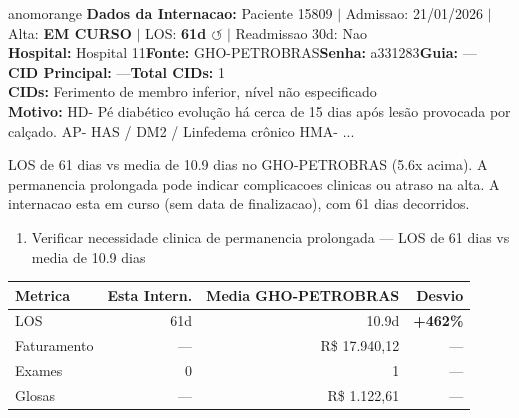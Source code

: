 \documentclass[a4paper,10pt]{article}
\begin{document}
\begin{anomalycard}[Internacao 162690 | GHO-PETROBRAS | ALTO (z=3.23)]{anomorange}
\textbf{Dados da Internacao:} Paciente 15809 $\mid$ Admissao: 21/01/2026 $\mid$ Alta: \textcolor{anomorange}{\textbf{EM CURSO}} $\mid$ LOS: \textbf{61d \textcolor{anomorange}{$\circlearrowleft$}} $\mid$ Readmissao 30d: Nao\\
\textbf{Hospital:} Hospital 11\quad\textbf{Fonte:} GHO-PETROBRAS\quad\textbf{Senha:} a331283\quad\textbf{Guia:} ---\\
\textbf{CID Principal:} {\small ---}\quad\textbf{Total CIDs:} 1\\

\textbf{CIDs:} {\scriptsize Ferimento de membro inferior, nível não especificado}\\

\textbf{Motivo:} {\scriptsize HD-  Pé diabético evolução há cerca de 15 dias após lesão provocada por calçado.   AP- HAS / DM2  / Linfedema crônico   HMA- ...}\\

\vspace{2pt}\begin{tcolorbox}[colback=severityred!20,colframe=anomorange,title={\textbf{Interpretacao de Negocio}},fonttitle=\bfseries\small,left=4pt,right=4pt,top=3pt,bottom=3pt]
{\small LOS de 61 dias vs media de 10.9 dias no GHO-PETROBRAS (5.6x acima). A permanencia prolongada pode indicar complicacoes clinicas ou atraso na alta. A internacao esta em curso (sem data de finalizacao), com 61 dias decorridos.}
\end{tcolorbox}
\begin{tcolorbox}[colback=severityyellow!30,colframe=anomorange,title={\textbf{Recomendacoes Especificas}},fonttitle=\bfseries\small,left=4pt,right=4pt,top=3pt,bottom=3pt]
\begin{enumerate}[nosep,leftmargin=16pt]
\item {\small Verificar necessidade clinica de permanencia prolongada --- LOS de 61 dias vs media de 10.9 dias}
\end{enumerate}
\end{tcolorbox}
\begin{center}\begin{tabular}{l r r r}\toprule\textbf{Metrica} & \textbf{Esta Intern.} & \textbf{Media GHO-PETROBRAS} & \textbf{Desvio} \\\midrule
LOS & 61d & 10.9d & \textcolor{anomred}{\textbf{+462\%}} \\
Faturamento & --- & R\$ 17.940,12 & --- \\
Exames & 0 & 1 & --- \\
Glosas & --- & R\$ 1.122,61 & --- \\
\bottomrule\end{tabular}\end{center}


\end{anomalycard}
\end{document}

